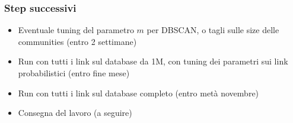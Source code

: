 \documentclass{beamer}
\begin{document}
\begin{frame}
\frametitle{Step successivi}
\begin{itemize}
\item Eventuale tuning del parametro $m$ per DBSCAN, o tagli sulle size delle communities (entro 2 settimane)
\item Run con tutti i link sul database da 1M, con tuning dei parametri sui link probabilistici (entro fine mese)
\item Run con tutti i link sul database completo (entro metà novembre)
\item Consegna del lavoro (a seguire)
\end{itemize}
\end{frame}
\end{document}

